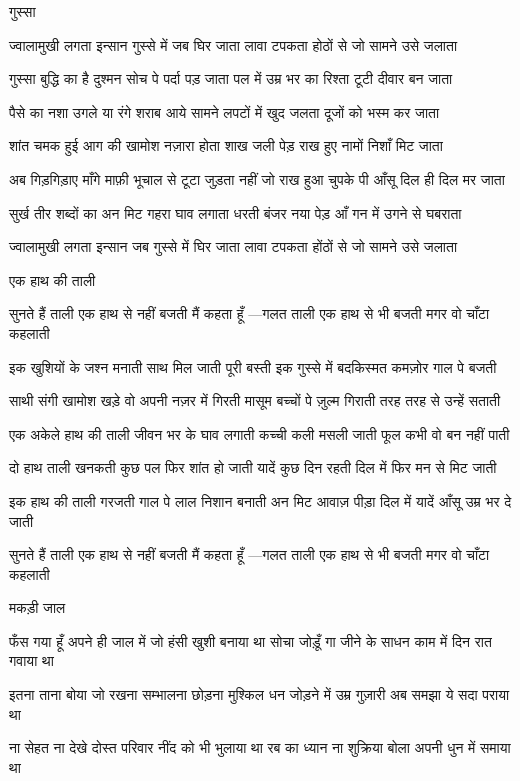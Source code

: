 गुस्सा

ज्वालामुखी लगता इन्सान
 गुस्से में जब घिर जाता
लावा टपकता होठों से
जो सामने उसे जलाता




गुस्सा बुद्धि का है दुश्मन
सोच पे पर्दा पड़ जाता
पल में उम्र भर का रिश्ता
टूटी दीवार बन जाता

पैसे का नशा उगले या
रंगे शराब आये सामने
लपटों में खुद जलता
दूजों को भस्म कर जाता


शांत चमक हुई आग की
खामोश नज़ारा होता
शाख जली पेड़ राख हुए 
नामों निशाँ मिट जाता

अब गिड़गिड़ाए माँगे माफ़ी
भूचाल से टूटा जुड़ता नहीं
जो राख हुआ चुपके पी आँसू
दिल ही दिल मर जाता


सुर्ख तीर शब्दों का अन मिट
गहरा घाव लगाता
धरती बंजर नया पेड़ आँ गन में
उगने से घबराता

ज्वालामुखी लगता इन्सान
जब गुस्से में घिर जाता
लावा टपकता होंठों से
जो सामने उसे जलाता


एक हाथ की ताली

सुनते हैं ताली एक हाथ से नहीं बजती
मैं कहता हूँ —गलत
ताली एक हाथ से भी बजती
मगर वो चाँटा कहलाती





इक खुशियों के जश्न मनाती
साथ मिल जाती पूरी बस्ती
इक गुस्से में बदकिस्मत
कमज़ोर गाल पे बजती

साथी संगी खामोश खड़े
वो अपनी नज़र में गिरती
मासूम बच्चों पे ज़ुल्म गिराती
तरह तरह से उन्हें सताती


एक अकेले हाथ की ताली
जीवन भर के घाव लगाती
कच्ची कली मसली जाती
फूल कभी वो बन नहीं पाती

दो हाथ ताली खनकती कुछ पल
फिर शांत हो जाती 
यादें कुछ दिन रहती दिल में 
फिर मन से मिट जाती 




इक हाथ की ताली गरजती
गाल पे लाल निशान बनाती
अन मिट आवाज़ पीड़ा दिल में
यादें आँसू उम्र भर दे जाती

सुनते हैं ताली एक हाथ से नहीं बजती
मैं कहता हूँ —गलत
ताली एक हाथ से भी बजती
मगर वो चाँटा कहलाती



मकड़ी जाल

फँस गया हूँ अपने ही जाल में
जो हंसी खुशी बनाया था
सोचा जोड़ूँ गा जीने के साधन
काम में दिन रात गवाया था

इतना ताना बोया जो रखना
सम्भालना छोड़ना मुश्किल
धन जोड़ने में उम्र गुज़ारी
अब समझा ये सदा पराया था

ना सेहत ना देखे दोस्त परिवार
नींद को भी भुलाया था
रब का ध्यान ना शुक्रिया बोला
अपनी धुन में समाया था


